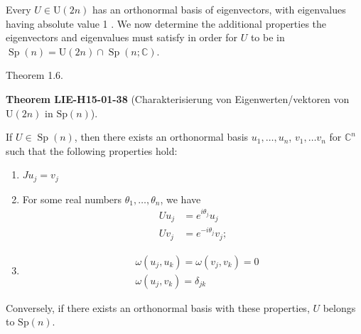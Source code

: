 \documentclass[10pt, letterpaper]{article}
\newcommand{\Sp}{\mathrm{Sp}}
\newcommand{\U}{\mathrm{U}}
\newcommand{\CustomHeading}[3]{%
  \par\medskip\noindent%
  \textbf{#1 #2} \textnormal{(#3)}.\enskip%
}
\newenvironment{THEO}[2]{\begin{unitbox}\CustomHeading{Theorem}{#1}{#2}}{\end{unitbox}}
\begin{document}
Every $U \in \mathrm{U}(2 n)$ has an orthonormal basis of eigenvectors, with eigenvalues having absolute value 1 . We now determine the additional properties the eigenvectors and eigenvalues must satisfy in order for $U$ to be in $\operatorname{Sp}(n)=\mathrm{U}(2 n) \cap \operatorname{Sp}(n ; \mathbb{C})$.

Theorem 1.6. 

\begin{THEO}{LIE-H15-01-38}{Charakterisierung von Eigenwerten/vektoren von $\U(2n)$ in $\Sp(n)$}
If $U \in \operatorname{Sp}(n)$, then there exists an orthonormal basis $u_{1}, \ldots, u_{n}$, $v_{1}, \ldots v_{n}$ for $\mathbb{C}^{n}$ such that the following properties hold: 

\begin{enumerate}
\item $J u_{j}=v_{j}$
\item For some real numbers $\theta_{1}, \ldots, \theta_{n}$, we have
$$
\begin{aligned}
U u_{j} & =e^{i \theta_{j}} u_{j} \\
U v_{j} & =e^{-i \theta_{j}} v_{j} ;
\end{aligned}
$$
\item $$
\begin{aligned}
& \omega\left(u_{j}, u_{k}\right)=\omega\left(v_{j}, v_{k}\right)=0 \\
& \omega\left(u_{j}, v_{k}\right)=\delta_{j k}
\end{aligned}
$$
\end{enumerate}
Conversely, if there exists an orthonormal basis with these properties, $U$ belongs to $\mathrm{Sp}(n)$.
\end{THEO}
\end{document}
